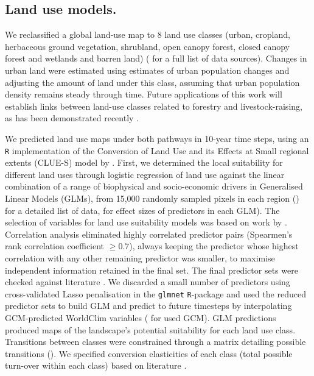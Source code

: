 \documentclass[titlesmallcaps,copyrightpage]{uomthesis}\usepackage[]{graphicx}\usepackage[]{color}
\begin{document}
\subsection{Land use models.} We reclassified a global land-use map to 8 land use classes (urban, cropland, herbaceous ground vegetation, shrubland, open canopy forest, closed canopy forest and wetlands and barren land) ( for a full list of data sources). Changes in urban land were estimated using estimates of urban population changes \citep{world_bank_group_population_2016} and adjusting the amount of land under this class, assuming that urban population density remains steady through time. Future applications of this work will establish links between land-use classes related to forestry and livestock-raising, as has been demonstrated recently \citep{marques_increasing_2019}.

We predicted land use maps under both pathways in 10-year time steps, using an \texttt{R} implementation \citep[\texttt{R} package \texttt{lulcc}]{moulds_open_2015} of the Conversion of Land Use and its Effects at Small regional extents (CLUE-S) model by \citet{verburg_modeling_2002}. First, we determined the local suitability for different land uses through logistic regression of land use against the linear combination of a range of biophysical and socio-economic drivers in Generalised Linear Models (GLMs), from 15,000 randomly sampled pixels in each region () for a detailed list of data,  for effect sizes of predictors in each GLM). The selection of variables for land use suitability models was based on work by \citet{verburg_land_1999}. Correlation analysis eliminated highly correlated predictor pairs (Spearmen's rank correlation coefficient \(\geq 0.7\)), always keeping the predictor whose highest correlation with any other remaining predictor was smaller, to maximise independent information retained in the final set. The final predictor sets were checked against literature \citep{verburg_downscaling_2006, verburg_spatial_1999}. We discarded a small number of predictors using cross-validated Lasso penalisation in the \texttt{glmnet} \texttt{R}-package \citep{friedman_regularization_2010} and used the reduced predictor sets to build GLM and predict to future timesteps by interpolating GCM-predicted WorldClim variables ( for used GCM). GLM predictions produced maps of the landscape's potential suitability for each land use class. Transitions between classes were constrained through a matrix detailing possible transitions (). We specified conversion elasticities of each class (total possible turn-over within each class) based on literature \citep{moulds_open_2015,verburg_modeling_2002}.
\end{document}
